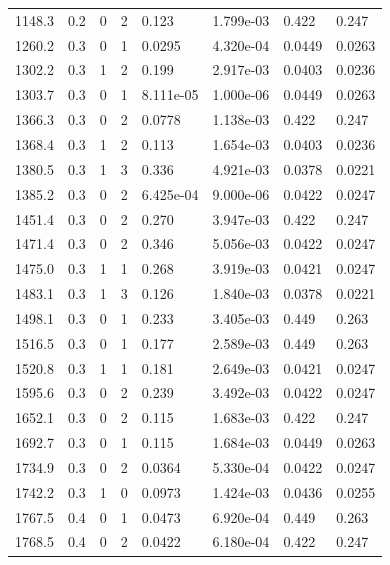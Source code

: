 \documentclass[preview]{standalone}
\begin{document}
{{{\begin{tabular}{L{1.2cm}C{1.2cm} C{0.3cm}C{0.5cm} C{1.4cm}C{1.4cm} C{1.4cm}C{1.4cm}}
  1148.3  &   0.2  & 0     &  2 &  0.123  & 1.799e-03  & 0.422 &  0.247   \\ 
  1260.2  &   0.3  & 0     &  1 &  0.0295  & 4.320e-04  & 0.0449 &  0.0263   \\ 
  1302.2  &   0.3  & 1     &  2 &  0.199  & 2.917e-03  & 0.0403 &  0.0236   \\ 
  1303.7  &   0.3  & 0     &  1 &  8.111e-05  & 1.000e-06  & 0.0449 &  0.0263   \\ 
  1366.3  &   0.3  & 0     &  2 &  0.0778  & 1.138e-03  & 0.422 &  0.247   \\ 
  1368.4  &   0.3  & 1     &  2 &  0.113  & 1.654e-03  & 0.0403 &  0.0236   \\ 
  1380.5  &   0.3  & 1     &  3 &  0.336  & 4.921e-03  & 0.0378 &  0.0221   \\ 
  1385.2  &   0.3  & 0     &  2 &  6.425e-04  & 9.000e-06  & 0.0422 &  0.0247   \\ 
  1451.4  &   0.3  & 0     &  2 &  0.270  & 3.947e-03  & 0.422 &  0.247   \\ 
  1471.4  &   0.3  & 0     &  2 &  0.346  & 5.056e-03  & 0.0422 &  0.0247   \\ 
  1475.0  &   0.3  & 1     &  1 &  0.268  & 3.919e-03  & 0.0421 &  0.0247   \\ 
  1483.1  &   0.3  & 1     &  3 &  0.126  & 1.840e-03  & 0.0378 &  0.0221   \\ 
  1498.1  &   0.3  & 0     &  1 &  0.233  & 3.405e-03  & 0.449 &  0.263   \\ 
  1516.5  &   0.3  & 0     &  1 &  0.177  & 2.589e-03  & 0.449 &  0.263   \\ 
  1520.8  &   0.3  & 1     &  1 &  0.181  & 2.649e-03  & 0.0421 &  0.0247   \\ 
  1595.6  &   0.3  & 0     &  2 &  0.239  & 3.492e-03  & 0.0422 &  0.0247   \\ 
  1652.1  &   0.3  & 0     &  2 &  0.115  & 1.683e-03  & 0.422 &  0.247   \\ 
  1692.7  &   0.3  & 0     &  1 &  0.115  & 1.684e-03  & 0.0449 &  0.0263   \\ 
  1734.9  &   0.3  & 0     &  2 &  0.0364  & 5.330e-04  & 0.0422 &  0.0247   \\ 
  1742.2  &   0.3  & 1     &  0 &  0.0973  & 1.424e-03  & 0.0436 &  0.0255   \\ 
  1767.5  &   0.4  & 0     &  1 &  0.0473  & 6.920e-04  & 0.449 &  0.263   \\ 
  1768.5  &   0.4  & 0     &  2 &  0.0422  & 6.180e-04  & 0.422 &  0.247   \\ 

\end{tabular}}}}
\end{document}
